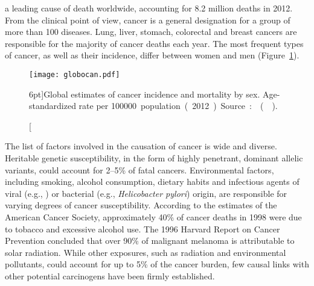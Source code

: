 \bigskip


 a leading cause of death worldwide, accounting
for 8.2 million deaths in 2012.  From the clinical point of view, cancer is a
general designation for a group of more than 100 diseases.  Lung, liver,
stomach, colorectal and breast cancers are responsible for the majority of
cancer deaths each year.  The most frequent types of cancer, as well as their
incidence, differ between women and men
(Figure~\ref{fig:globocan}).\cite{ferlay_globocan_2014}

\begin{figure}[ht]
  \texttt{[image: globocan.pdf]}
  \caption[Global estimates of cancer incidence and mortality by
  sex][6pt]{Global estimates of cancer incidence and mortality by sex.
    \mbox{Age-standardized} rate per \SI{100000} population (2012).  Source:
    \mbox{} (\citealp{ferlay_globocan_2014}).}
  \label{fig:globocan}
\end{figure}

The list of factors involved in the causation of cancer is wide and diverse.
Heritable genetic susceptibility, in the form of highly penetrant, dominant
allelic variants, could account for 2--5\% of fatal cancers.  Environmental
factors, including smoking, alcohol consumption, dietary habits and infectious
agents of viral (e.g., ) or bacterial (e.g., \emph{Helicobacter
  pylori}) origin, are responsible for varying degrees of cancer
susceptibility.\cite{cassidy_oxford_2010} According to the estimates of the
American Cancer Society, approximately 40\% of cancer deaths in 1998 were due to
tobacco and excessive alcohol use.  The 1996 Harvard Report on Cancer Prevention
concluded that over 90\% of malignant melanoma is attributable to solar
radiation.  While other exposures, such as radiation and environmental
pollutants, could account for up to 5\% of the cancer burden, few causal links
with other potential carcinogens have been firmly established.

